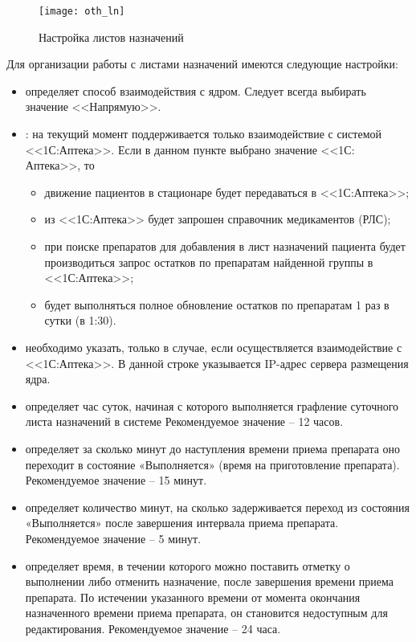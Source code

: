 \begin{figure}[ht]\centering
 \texttt{[image: oth\_ln]}
 \caption{Настройка листов назначений}
 \label{img_oth_ln}
\end{figure}

Для организации работы с листами назначений имеются следующие настройки:
\begin{itemize}
 \item {} определяет способ взаимодействия с ядром. Следует всегда выбирать значение <<Напрямую>>.
 \item {}: на текущий момент поддерживается только взаимодействие с системой <<1С:Аптека>>. Если в данном пункте выбрано значение <<1С: Аптека>>, то
 \begin{itemize}
  \item движение пациентов в стационаре будет передаваться в <<1С:Аптека>>;
  \item из <<1С:Аптека>> будет запрошен справочник медикаментов (РЛС);
  \item при поиске препаратов для добавления в лист назначений пациента будет производиться запрос остатков по препаратам найденной группы в <<1С:Аптека>>;
  \item будет выполняться полное обновление остатков по препаратам 1 раз в сутки (в 1:30).
 \end{itemize} 
 \item {} необходимо указать, только в случае, если осуществляется взаимодействие с <<1С:Аптека>>. В данной строке указывается IP-адрес сервера размещения ядра.
 \item {} определяет час суток, начиная с которого выполняется графление суточного листа назначений в системе Рекомендуемое значение – 12 часов.
 \item {} определяет за сколько минут до наступления времени приема препарата оно переходит в состояние «Выполняется» (время на приготовление препарата). Рекомендуемое значение – 15 минут.
 \item {} определяет количество минут, на сколько задерживается переход из состояния «Выполняется» после завершения интервала приема препарата. Рекомендуемое значение – 5 минут.
 \item {} определяет время, в течении которого можно поставить отметку о выполнении либо отменить назначение, после завершения времени приема препарата. По истечении указанного времени от момента окончания назначенного времени приема препарата, он становится недоступным для редактирования. Рекомендуемое значение – 24 часа.
\end{itemize} 

